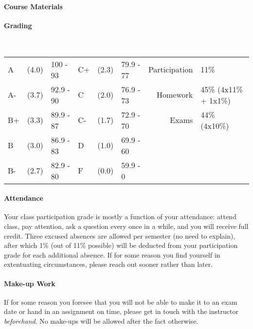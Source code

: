 \documentclass{article}
\begin{document}
  \paragraph{Course Materials}

  \paragraph{Grading} \mbox{}\\
    {\small
      \begin{tabular}{@{} l @{} l l l @{} l l | r l @{}}
        A   & (4.0) & 100 - 93  & C+  & (2.3) & 79.9 - 77 & Participation & 11\%\\
        A-  & (3.7) & 92.9 - 90 & C   & (2.0) & 76.9 - 73 & Homework      & 45\% (4x11\% + 1x1\%)\\
        B+  & (3.3) & 89.9 - 87 & C-  & (1.7) & 72.9 - 70 & Exams         & 44\% (4x10\%)\\
        B   & (3.0) & 86.9 - 83 & D   & (1.0) & 69.9 - 60 & \\
        B-  & (2.7) & 82.9 - 80 & F   & (0.0) & 59.9 - 0  & \\
      \end{tabular}
    }

  \paragraph{Attendance}
    Your class participation grade is mostly a function of your attendance: attend class, pay attention, ask a question every once in a while, and you will receive full credit. Three excused absences are allowed per semester (no need to explain), after which 1\% (out of 11\% possible) will be deducted from your participation grade for each additional absence. If for some reason you find yourself in extentuating circumstances, please reach out sooner rather than later.

  \paragraph{Make-up Work}
    If for some reason you foresee that you will not be able to make it to an exam date or hand in an assignment on time, please get in touch with the instructor \emph{beforehand}. No make-ups will be allowed after the fact otherwise.
\end{document}
